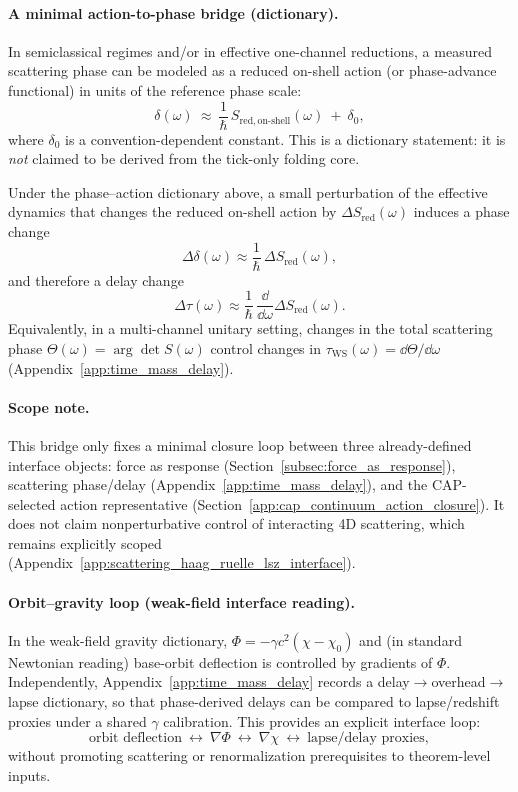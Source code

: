 \paragraph{A minimal action-to-phase bridge (dictionary).}
\InterfaceTag In semiclassical regimes and/or in effective one-channel reductions, a measured scattering phase can be modeled as a reduced on-shell action (or phase-advance functional) in units of the reference phase scale:
\[
\delta(\omega)\ \approx\ \frac{1}{\hbar}\,S_{\mathrm{red,on\text{-}shell}}(\omega)\ +\ \delta_0,
\]
where $\delta_0$ is a convention-dependent constant.
This is a dictionary statement: it is \emph{not} claimed to be derived from the tick-only folding core.

\begin{proposition}
\label{prop:force_to_delay_via_phase_derivative_interface}
\InterfaceTag Under the phase--action dictionary above, a small perturbation of the effective dynamics that changes the reduced on-shell action by $\Delta S_{\mathrm{red}}(\omega)$ induces a phase change
\[
\Delta\delta(\omega)\approx \frac{1}{\hbar}\,\Delta S_{\mathrm{red}}(\omega),
\]
and therefore a delay change
\[
\Delta\tau(\omega)\approx \frac{1}{\hbar}\,\frac{\dd}{\dd\omega}\Delta S_{\mathrm{red}}(\omega).
\]
Equivalently, in a multi-channel unitary setting, changes in the total scattering phase $\Theta(\omega)=\arg\det S(\omega)$ control changes in $\tau_{\mathrm{WS}}(\omega)=\dd\Theta/\dd\omega$ (Appendix~\ref{app:time_mass_delay}).
\end{proposition}

\paragraph{Scope note.}
\AuditTag This bridge only fixes a minimal closure loop between three already-defined interface objects: force as response (Section~\ref{subsec:force_as_response}), scattering phase/delay (Appendix~\ref{app:time_mass_delay}), and the CAP-selected action representative (Section~\ref{app:cap_continuum_action_closure}).
It does not claim nonperturbative control of interacting 4D scattering, which remains explicitly scoped (Appendix~\ref{app:scattering_haag_ruelle_lsz_interface}).

\paragraph{Orbit--gravity loop (weak-field interface reading).}
\InterfaceTag In the weak-field gravity dictionary, $\Phi=-\gamma c^2(\chi-\chi_0)$ and (in standard Newtonian reading) base-orbit deflection is controlled by gradients of $\Phi$.
Independently, Appendix~\ref{app:time_mass_delay} records a delay$\to$overhead$\to$lapse dictionary, so that phase-derived delays can be compared to lapse/redshift proxies under a shared $\gamma$ calibration.
This provides an explicit interface loop:
\[
\text{orbit deflection}\ \leftrightarrow\ \nabla\Phi\ \leftrightarrow\ \nabla\chi\ \leftrightarrow\ \text{lapse/delay proxies},
\]
without promoting scattering or renormalization prerequisites to theorem-level inputs.
